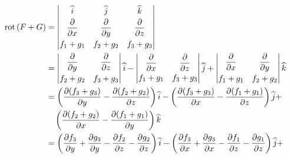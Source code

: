 \documentclass[fleqn, 12pt]{article}
\newcommand{\derivadaparcial}[2]{\dfrac{\partial {#1}}{\partial {#2}}}
\newcommand{\rot}{\mathrm{\, rot \,}}
\begin{document}
\begin{enumerate}
        \begin{align*}
            \rot (F + G) &= \left\rvert 
            \begin{matrix}
                \widehat{i} & \widehat{j} & \widehat{k} \vspace{1mm} \\
                \derivadaparcial{}{x} & \derivadaparcial{}{y} & \derivadaparcial{}{z} \vspace{1mm} \\
                f_1 + g_1 & f_2 + g_2 & f_3 + g_3
            \end{matrix}
            \right\rvert \\
            &= \left\rvert 
            \begin{matrix}
                \derivadaparcial{}{y} & \derivadaparcial{}{z} \vspace{1mm} \\
                f_2 + g_2 & f_3 + g_3
            \end{matrix}
            \right\rvert \widehat{i} -
            \left\rvert 
            \begin{matrix}
                \derivadaparcial{}{x} & \derivadaparcial{}{z} \vspace{1mm} \\
                f_1 + g_1 & f_3 + g_3
            \end{matrix}
            \right\rvert \widehat{j} +
            \left\rvert 
            \begin{matrix}
                \derivadaparcial{}{x} & \derivadaparcial{}{y} \vspace{1mm} \\
                f_1 + g_1 & f_2 + g_2
            \end{matrix}
            \right\rvert \widehat{k} \\
            &= \left( \derivadaparcial{(f_3 + g_3)}{y} - \derivadaparcial{(f_2 + g_2)}{z} \right) \widehat{i} - \left( \derivadaparcial{(f_3 + g_3)}{x} - \derivadaparcial{(f_1 + g_1)}{z} \right) \widehat{j} + \\
            & \quad \left( \derivadaparcial{(f_2 + g_2)}{x} - \derivadaparcial{(f_1 + g_1)}{y} \right) \widehat{k} \\
            &= \left( \derivadaparcial{f_3}{y} + \derivadaparcial{g_3}{y} - \derivadaparcial{f_2}{z} - \derivadaparcial{g_2}{z} \right) \widehat{i} - \left( \derivadaparcial{f_3}{x} + \derivadaparcial{g_3}{x} - \derivadaparcial{f_1}{z} - \derivadaparcial{g_1}{z} \right) \widehat{j} + \\

\end{align*}
\end{enumerate}
\end{document}
